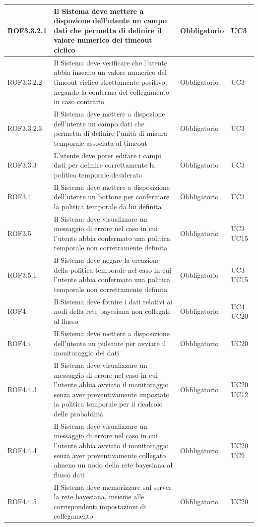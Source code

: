 \begin{center}
\begin{longtable}[c]{|m{}|m{}|m{}|m{}|}
\hline
ROF3.3.2.1 & Il Sistema deve mettere a dispozione dell'utente un campo dati che permetta di definire il valore numerico del timeout ciclico & Obbligatorio & UC3\\
\hline
ROF3.3.2.2 & Il Sistema deve verificare che l’utente abbia inserito un valore numerico
del timeout ciclico strettamente positivo, negando la conferma del collegamento in caso contrario & Obbligatorio & UC3 \\
\hline
\rowcolor{grigio}ROF3.3.2.3 & Il Sistema deve mettere a dispozione dell'utente un campo dati che permetta di definire l'unità di misura temporale associata al timeout & Obbligatorio & UC3\\
\hline
ROF3.3.3 & L'utente deve poter editare i campi dati per definire correttamente la politica temporale desiderata & Obbligatorio & UC3\\
\hline
\rowcolor{grigio}ROF3.4 & Il Sistema deve mettere a disposizione dell'utente un bottone per confermare la politica temporale da lui definita & Obbligatorio & UC3\\
\hline
ROF3.5 & Il Sistema deve visualizzare un messaggio di errore nel caso in cui l'utente abbia confermato una politica temporale non correttamente definita & Obbligatorio & UC3 UC15\\
\hline
ROF3.5.1 & Il Sistema deve negare la creazione della politica temporale nel caso in cui l'utente abbia confermato una politica temporale non correttamente definita & Obbligatorio & UC3 UC15 \\
\hline
\rowcolor{grigio}ROF4 & Il Sistema deve fornire i dati relativi ai nodi della rete bayesiana non collegati al flusso & Obbligatorio & UC4 UC20\\
\hline
ROF4.4 & Il Sistema deve mettere a disposizione dell'utente un pulsante per avviare il monitoraggio dei dati & Obbligatorio & UC20\\
\hline
\rowcolor{grigio}ROF4.4.3 & Il Sistema deve visualizzare un messaggio di errore nel caso in cui l'utente abbia avviato il monitoraggio senza aver preventivamente impostato la politica temporale per il ricalcolo delle probabilità & Obbligatorio & UC20 UC12\\
\hline
ROF4.4.4 & Il Sistema deve visualizzare un messaggio di errore nel caso in cui l'utente abbia avviato il monitoraggio senza aver preventivamente collegato almeno un nodo della rete bayesiana al flusso dati & Obbligatorio & UC20 UC9\\
\hline
ROF4.4.5 & Il Sistema deve memorizzare sul server la rete bayesiana, insieme alle corrispondenti impostazioni di collegamento & Obbligatorio & UC20\\

\end{longtable}
\end{center}

